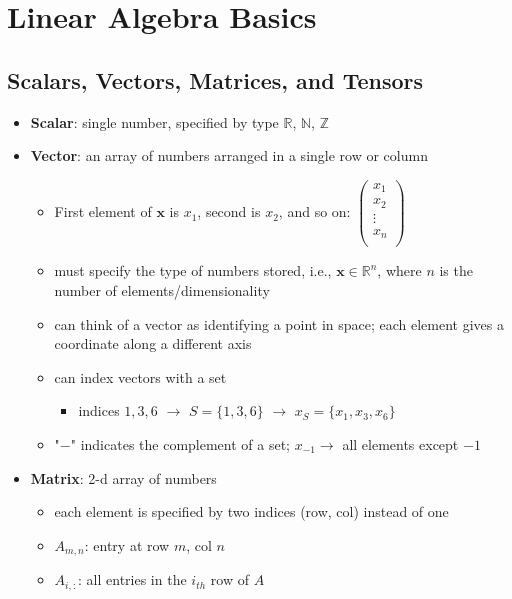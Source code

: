 \section{Linear Algebra Basics}
\subsection{Scalars, Vectors, Matrices, and Tensors}
\begin{itemize}
    \item \textbf{Scalar}: single number, specified by type $\mathbb{R}$, $\mathbb{N}$, $\mathbb{Z}$
    \item \textbf{Vector}: an array of numbers arranged in a single row or column 
    \begin{itemize}
        \item First element of $\mathbf{x}$ is $x_1$, second is $x_2$, and so on:
        $\begin{pmatrix}
            x_1 \\
            x_2 \\
            \vdots \\
            x_n \\
        \end{pmatrix}$
        \item must specify the type of numbers stored, i.e., $\mathbf{x} \in \mathbb{R}^n$, where $n$ is the number of elements/dimensionality
        \item can think of a vector as identifying a point in space; each element gives a coordinate along a different axis
        \item can index vectors with a set
        \begin{itemize}
            \item indices $1, 3, 6$ $\rightarrow$ $S = \{1, 3, 6\}$ $\rightarrow$ $x_S = \{x_1, x_3, x_6\}$
        \end{itemize}
        \item "$-$" indicates the complement of a set; $x_{-1} \rightarrow$ all elements except $-1$
    \end{itemize}
    \item \textbf{Matrix}: 2-d array of numbers
    \begin{itemize}
        \item each element is specified by two indices (row, col) instead of one
        \item $A_{m,n}$: entry at row $m$, col $n$
        \item $A_{i, :}$: all entries in the $i_{th}$ row of $A$

\end{itemize}
\end{itemize}

